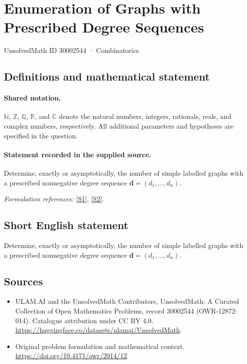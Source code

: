 \documentclass[11pt]{article}
\newcommand{\sref}[2]{\hyperlink{source:#1:#2}{[S#2]}}
\begin{document}
\setcounter{section}{30002543}
\section{Enumeration of Graphs with Prescribed Degree Sequences}\label{30002544}
{\small UnsolvedMath ID 30002544 · Combinatorics}
\subsection{Definitions and mathematical statement}

\paragraph{Shared notation.}$\mathbb N$, $\mathbb Z$, $\mathbb Q$, $\mathbb R$, and $\mathbb C$ denote the natural numbers, integers, rationals, reals, and complex numbers, respectively. All additional parameters and hypotheses are specified in the question.


\paragraph{Statement recorded in the supplied source.}
Determine, exactly or asymptotically, the number of simple labelled graphs with a prescribed nonnegative degree sequence $\mathbf d=(d_1,\ldots,d_n)$.
\par\smallskip\textit{Formulation references:} \sref{30002544}{1}, \sref{30002544}{2}.
\subsection{Short English statement}
Determine, exactly or asymptotically, the number of simple labelled graphs with a prescribed nonnegative degree sequence $\mathbf d=(d_1,\ldots,d_n)$.
\subsection{Sources}
\begin{itemize}
\item[\hypertarget{source:30002544:1}{S1}] ULAM.AI and the UnsolvedMath Contributors, UnsolvedMath: A Curated Collection of Open Mathematics Problems, record 30002544 (OWR-12872-014). Catalogue attribution under CC BY 4.0.
\url{https://huggingface.co/datasets/ulamai/UnsolvedMath}.
\item[\hypertarget{source:30002544:2}{S2}] Original problem formulation and mathematical context.
\url{https://doi.org/10.4171/owr/2014/12}.
\end{itemize}
\label{end:30002544}
\end{document}
